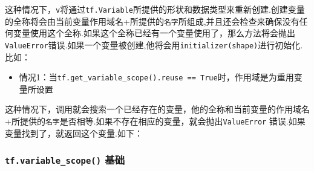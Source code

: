 这种情况下，\texttt{v}将通过\texttt{tf.Variable}所提供的形状和数据类型来重新创建.创建变量的全称将会由当前变量作用域名+所提供的\texttt{名字}所组成,并且还会检查来确保没有任何变量使用这个全称.如果这个全称已经有一个变量使用了，那么方法将会抛出\texttt{ValueError}错误.如果一个变量被创建,他将会用\texttt{initializer(shape)}进行初始化.比如：

\begin{Shaded}
\begin{Highlighting}[]
 \NormalTok{):}
    \OperatorTok{=} \NormalTok{, [}\NormalTok{])}
 \OperatorTok{==} 
\end{Highlighting}
\end{Shaded}

\begin{itemize}
\tightlist
\item
  情况1：当\texttt{tf.get\_variable\_scope().reuse\ ==\ True}时，作用域是为重用变量所设置
\end{itemize}

这种情况下，调用就会搜索一个已经存在的变量，他的全称和当前变量的作用域名+所提供的\texttt{名字}是否相等.如果不存在相应的变量，就会抛出\texttt{ValueError}
错误.如果变量找到了，就返回这个变量.如下：

\begin{Shaded}
\begin{Highlighting}[]
 \NormalTok{):}
    \OperatorTok{=} \NormalTok{, [}\NormalTok{])}
 \OperatorTok{=}\NormalTok{):}
    \OperatorTok{=} \NormalTok{, [}\NormalTok{])}
 \OperatorTok{==} 
\end{Highlighting}
\end{Shaded}

\subsubsection{\texorpdfstring{\texttt{tf.variable\_scope()}
基础}{tf.variable\_scope() 基础}}\label{tf.variableux5fscope-ux57faux7840}

